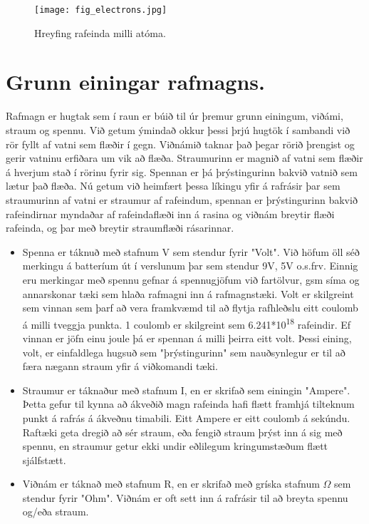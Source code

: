\begin{figure}
\center
\texttt{[image: fig\_electrons.jpg]}
\caption{Hreyfing rafeinda milli atóma.}
\end{figure}

\section{Grunn einingar rafmagns.}

Rafmagn er hugtak sem í raun er búið til úr þremur grunn einingum, viðámi, straum og spennu. Við getum ýmindað okkur þessi þrjú hugtök í sambandi við rör fyllt af vatni sem flæðir í gegn. Viðnámið taknar það þegar rörið þrengist og gerir vatninu erfiðara um vik að flæða. Straumurinn er magnið af vatni sem flæðir á hverjum stað í rörinu fyrir sig. Spennan er þá þrýstingurinn bakvið vatnið sem lætur það flæða. Nú getum við heimfært þessa líkingu yfir á rafrásir þar sem straumurinn af vatni er straumur af rafeindum, spennan er þrýstingurinn bakvið rafeindirnar myndaðar af rafeindaflæði inn á rasina og viðnám breytir flæði rafeinda, og þar með breytir straumflæði rásarinnar.

\begin{itemize}
\item Spenna er táknuð með stafnum V sem stendur fyrir "Volt". Við höfum öll séð merkingu á batteríum út í verslunum þar sem stendur 9V, 5V o.s.frv. Einnig eru merkingar með spennu gefnar á spennugjöfum við fartölvur, gsm síma og annarskonar tæki sem hlaða rafmagni inn á rafmagnstæki. Volt er skilgreint sem vinnan sem þarf að vera framkvæmd til að flytja rafhleðslu eitt coulomb á milli tveggja punkta. 1 coulomb er skilgreint sem 6.241*10\textsuperscript{18} rafeindir. Ef vinnan er jöfn einu joule þá er spennan á milli þeirra eitt volt. Þessi eining, volt, er einfaldlega hugsuð sem "þrýstingurinn" sem nauðsynlegur er til að færa nægann straum yfir á viðkomandi tæki. 

\item Straumur er táknaður með stafnum I, en er skrifað sem einingin "Ampere". Þetta gefur til kynna að ákveðið magn rafeinda hafi flætt framhjá tilteknum punkt á rafrás á ákveðnu timabili. Eitt Ampere er eitt coulomb á sekúndu. Raftæki geta dregið að sér straum, eða fengið straum þrýst inn á sig með spennu, en straumur getur ekki undir eðlilegum kringumstæðum flætt sjálfstætt.

\item Viðnám er táknað með stafnum R, en er skrifað með gríska stafnum $\Omega$ sem stendur fyrir "Ohm". Viðnám er oft sett inn á rafrásir til að breyta spennu og/eða straum.
\end{itemize}


